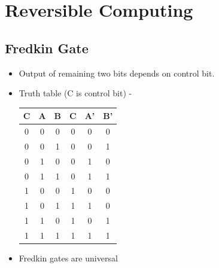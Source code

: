 \documentclass[11.5pt, paper=a4]{article}
\theoremstyle{definition}
\numberwithin{theorem}{section}
\begin{document}
\section{Reversible Computing}
\subsection{Fredkin Gate}
    \begin{itemize}
        \item Output of remaining two bits depends on control bit.
        \item Truth table (C is control bit) - 
            \begin{center}
            \begin{tabular}{ |c|c|c|c|c|c| } 
            \hline
            C & A & B & C & A' & B'\\ 
            \hline
            0 & 0 & 0 & 0 & 0 & 0\\
            0 & 0 & 1 & 0 & 0 & 1\\
            0 & 1 & 0 & 0 & 1 & 0\\
            0 & 1 & 1 & 0 & 1 & 1\\
            1 & 0 & 0 & 1 & 0 & 0\\
            1 & 0 & 1 & 1 & 1 & 0\\
            1 & 1 & 0 & 1 & 0 & 1\\
            1 & 1 & 1 & 1 & 1 & 1\\
            \hline
            \end{tabular}
            \end{center}
        \item Fredkin gates are universal
    \end{itemize}
\end{document}

